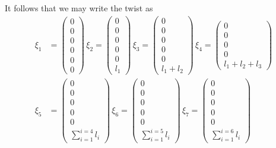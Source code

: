 %
It follows that we may write the twist as 
%
\begin{subequations}
	\begin{align}
	\xi_1 &= \left(\begin{array}{c}
	0 \\ 0 \\ 0 \\ 0\\ 0 \\ 0 
	\end{array}\right) \, 
	\xi_2 = \left(\begin{array}{c}
	0 \\ 0 \\ 0 \\ 0\\ 0 \\ l_1
	\end{array}\right) \, 
	\xi_3 = \left(\begin{array}{c}
	0 \\ 0 \\ 0 \\ 0 \\ 0 \\ l_1 + l_2
	\end{array}\right) \, 
	\xi_4 = \left(\begin{array}{c}
	0 \\ 0 \\0 \\ 0 \\  l_1 + l_2 + l_3
	\end{array}\right) \, \\
	\xi_5 &= \left(\begin{array}{c}
	0 \\ 0 \\ 0 \\ 0 \\ 0 \\ \sum_{i=1}^{i=4} l_i
	\end{array}\right) \, 
	\xi_6 = \left(\begin{array}{c}
	0 \\ 0 \\  0 \\ 0 \\ 0 \\ \sum_{i=1}^{i=5} l_i
	\end{array}\right) \, 
	\xi_7 = \left(\begin{array}{c}
	0 \\ 0 \\   0 \\ 0 \\ 0 \\ \sum_{i=1}^{i=6} l_i
	\end{array}\right)
	\end{align}
\end{subequations}
